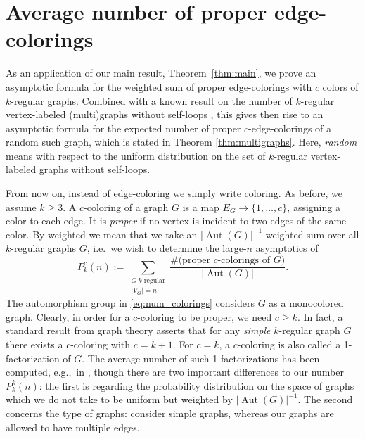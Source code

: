 \documentclass[a4paper,oneside]{amsart}
\numberwithin{theorem}{section}
\theoremstyle{remark}
\DeclareMathOperator{\Aut}{Aut}
\newcommand{\cE}{{P}}
\begin{document}
\section{Average number of proper edge-colorings}\label{sec:average}

As an application of our main result, Theorem~\ref{thm:main}, we prove an asymptotic formula for the weighted sum of proper edge-colorings with $c$ colors of $k$-regular graphs. 
Combined with a known result on the number of $k$-regular vertex-labeled (multi)graphs without self-loops \cite{bender1978asymptotic}, this gives then rise to an asymptotic formula for the expected number of proper $c$-edge-colorings of a random such graph, which is stated in Theorem \ref{thm:multigraphs}. Here, \emph{random} means with respect to the uniform distribution on the set of $k$-regular vertex-labeled graphs without self-loops.\par

From now on, instead of edge-coloring we simply write coloring. As before, we assume $k\geq 3$. A $c$-coloring of a graph $G$ is a map $E_G \rightarrow \{1,\dots,c\}$, assigning a color to each edge. It is \emph{proper} if no vertex is incident to two edges of the same color. By weighted we mean that we take an $|\Aut(G)|^{-1}$-weighted sum over all $k$-regular graphs $G$, i.e.\ we wish to determine the large-$n$ asymptotics of 
\begin{equation}
  \label{eq:num_colorings}
  \cE^{c}_k(n) := \sum_{\substack{G~ k\text{-regular}\\ |V_G| = n}} \frac{\#\text{(proper $c$-colorings of $G$)}}{|\Aut(G)|}.
\end{equation}
The automorphism group in \eqref{eq:num_colorings} considers $G$ as a monocolored graph.
Clearly, in order for a $c$-coloring to be proper, we need $c\geq k$. In fact, a standard result from graph theory asserts that for any \emph{simple} $k$-regular graph $G$ there exists a $c$-coloring with $c = k+1$. For $c=k$, a $c$-coloring is also called a 1-factorization of $G$. The average number of such 1-factorizations has been computed, e.g.,~in \cite{robinson1994almost}, though there are two important differences to our number $\cE^{k}_k(n)$: the first is regarding the probability distribution on the space of graphs which we do not take to be uniform but weighted by $|\Aut(G)|^{-1}$. The second concerns the type of graphs: \cite{robinson1994almost} consider simple graphs, whereas our graphs are allowed to have multiple edges.
\end{document}
